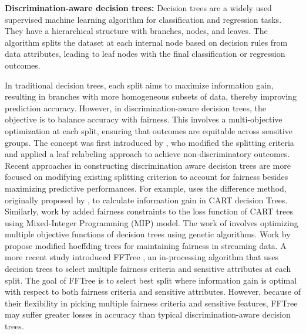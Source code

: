 \textbf{Discrimination-aware decision trees:} Decision trees are a widely used supervised machine learning algorithm for classification and regression tasks. They have a hierarchical structure with branches, nodes, and leaves. The algorithm splits the dataset at each internal node based on decision rules from data attributes, leading to leaf nodes with the final classification or regression outcomes.

In traditional decision trees, each split aims to maximize information gain, resulting in branches with more homogeneous subsets of data, thereby improving prediction accuracy. However, in discrimination-aware decision trees, the objective is to balance accuracy with fairness. This involves a multi-objective optimization at each split, ensuring that outcomes are equitable across sensitive groups. The concept was first introduced by \citet{kamiran2010discrimination}, who modified the splitting criteria and applied a leaf relabeling approach to achieve non-discriminatory outcomes.
Recent approaches in constructing discrimination aware decision trees are more focused on modifying existing splitting criterion to account for fairness besides maximizing predictive performances. For example, \citet{raff2018fair} uses the difference method, originally proposed by \cite{kamiran2010discrimination}, to calculate information gain in CART decision Trees. Similarly, work by \citet{aghaei2019learning} added fairness constraints to the loss function of CART trees using Mixed-Integer Programming (MIP) model. The work of \cite{valdivia2020fair} involves optimizing multiple objective functions of decision trees using genetic algorithms. Work by \cite{zhang2020feat} propose modified hoeffding trees for maintaining fairness in streaming data. A more recent study introduced FFTree \citep{castelnovo2022fftree}, an in-processing algorithm that uses decision trees to select multiple fairness criteria and sensitive attributes at each split. The goal of FFTree is to select best split where information gain is optimal with respect to both fairness criteria and sensitive attributes. However, because of their flexibility in picking multiple fairness criteria and sensitive features, FFTree may suffer greater losses in accuracy than typical discrimination-aware decision trees.  

